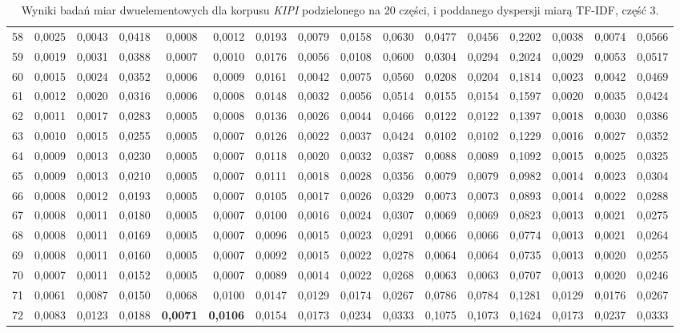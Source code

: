\begin{table}[htp!]
\begin{adjustwidth}{-2cm}{}
\begin{tabular}{ l | *{15}{| r}}
58	&	0,0025	&	0,0043	&	0,0418	&	0,0008	&	0,0012	&	0,0193	&	0,0079	&	0,0158	&	0,0630	&	0,0477	&	0,0456	&	0,2202	&	0,0038	&	0,0074	&	0,0566	\\
59	&	0,0019	&	0,0031	&	0,0388	&	0,0007	&	0,0010	&	0,0176	&	0,0056	&	0,0108	&	0,0600	&	0,0304	&	0,0294	&	0,2024	&	0,0029	&	0,0053	&	0,0517	\\
60	&	0,0015	&	0,0024	&	0,0352	&	0,0006	&	0,0009	&	0,0161	&	0,0042	&	0,0075	&	0,0560	&	0,0208	&	0,0204	&	0,1814	&	0,0023	&	0,0042	&	0,0469	\\
61	&	0,0012	&	0,0020	&	0,0316	&	0,0006	&	0,0008	&	0,0148	&	0,0032	&	0,0056	&	0,0514	&	0,0155	&	0,0154	&	0,1597	&	0,0020	&	0,0035	&	0,0424	\\
62	&	0,0011	&	0,0017	&	0,0283	&	0,0005	&	0,0008	&	0,0136	&	0,0026	&	0,0044	&	0,0466	&	0,0122	&	0,0122	&	0,1397	&	0,0018	&	0,0030	&	0,0386	\\
63	&	0,0010	&	0,0015	&	0,0255	&	0,0005	&	0,0007	&	0,0126	&	0,0022	&	0,0037	&	0,0424	&	0,0102	&	0,0102	&	0,1229	&	0,0016	&	0,0027	&	0,0352	\\
64	&	0,0009	&	0,0013	&	0,0230	&	0,0005	&	0,0007	&	0,0118	&	0,0020	&	0,0032	&	0,0387	&	0,0088	&	0,0089	&	0,1092	&	0,0015	&	0,0025	&	0,0325	\\
65	&	0,0009	&	0,0013	&	0,0210	&	0,0005	&	0,0007	&	0,0111	&	0,0018	&	0,0028	&	0,0356	&	0,0079	&	0,0079	&	0,0982	&	0,0014	&	0,0023	&	0,0304	\\
66	&	0,0008	&	0,0012	&	0,0193	&	0,0005	&	0,0007	&	0,0105	&	0,0017	&	0,0026	&	0,0329	&	0,0073	&	0,0073	&	0,0893	&	0,0014	&	0,0022	&	0,0288	\\
67	&	0,0008	&	0,0011	&	0,0180	&	0,0005	&	0,0007	&	0,0100	&	0,0016	&	0,0024	&	0,0307	&	0,0069	&	0,0069	&	0,0823	&	0,0013	&	0,0021	&	0,0275	\\
68	&	0,0008	&	0,0011	&	0,0169	&	0,0005	&	0,0007	&	0,0096	&	0,0015	&	0,0023	&	0,0291	&	0,0066	&	0,0066	&	0,0774	&	0,0013	&	0,0021	&	0,0264	\\
69	&	0,0008	&	0,0011	&	0,0160	&	0,0005	&	0,0007	&	0,0092	&	0,0015	&	0,0022	&	0,0278	&	0,0064	&	0,0064	&	0,0735	&	0,0013	&	0,0020	&	0,0255	\\
70	&	0,0007	&	0,0011	&	0,0152	&	0,0005	&	0,0007	&	0,0089	&	0,0014	&	0,0022	&	0,0268	&	0,0063	&	0,0063	&	0,0707	&	0,0013	&	0,0020	&	0,0246	\\
71	&	0,0061	&	0,0087	&	0,0150	&	0,0068	&	0,0100	&	0,0147	&	0,0129	&	0,0174	&	0,0267	&	0,0786	&	0,0784	&	0,1281	&	0,0129	&	0,0176	&	0,0267	\\
72	&	0,0083	&	0,0123	&	0,0188	&	\textbf{0,0071}	&	\textbf{0,0106}	&	0,0154	&	0,0173	&	0,0234	&	0,0333	&	0,1075	&	0,1073	&	0,1624	&	0,0173	&	0,0237	&	0,0333	\\
	\bottomrule
\end{tabular}
 \end{adjustwidth}
\caption[Wyniki badań miar dwuelementowych dla korpusu \emph{KIPI} podzielonego na 20 części, i poddanego dyspersji miarą TF-IDF, część 3]{Wyniki badań miar dwuelementowych dla korpusu \emph{KIPI} podzielonego na 20 części, i poddanego dyspersji miarą TF-IDF, część 3.}
\label{KIPI_TFIDF_20_part_3}
\end{table}

